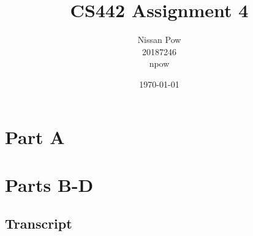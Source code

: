 \documentclass[onecolumn,11pt]{article}
\title{CS442 Assignment 4}
\author{Nissan Pow\\20187246\\npow}
\date{\today}
\begin{document}
\maketitle

\section*{Part A}

\section*{Parts B-D}

\subsection*{Transcript}
\end{document}
